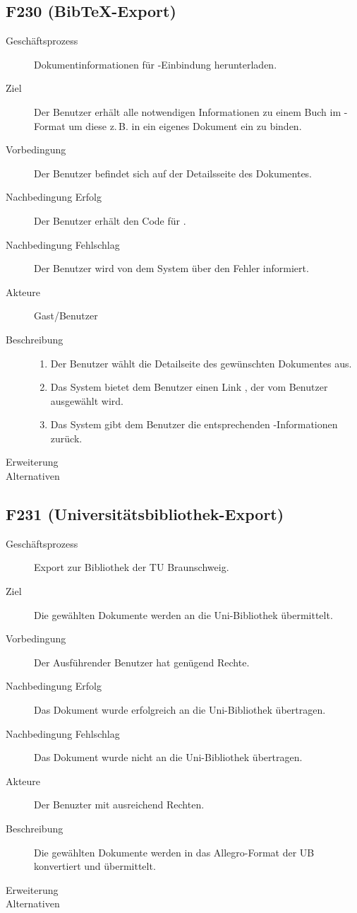 \subsection{F230 (Bib\TeX -Export)}
\begin{description}
  \item[Geschäftsprozess]Dokumentinformationen für \BibTeX-Einbindung herunterladen.
  \item[Ziel]Der Benutzer erhält alle notwendigen Informationen zu einem Buch im \BibTeX-Format um diese z.\,B. in ein eigenes Dokument ein zu binden.
  \item[Vorbedingung]Der Benutzer befindet sich auf der Detailsseite des Dokumentes.
  \item[Nachbedingung Erfolg]Der Benutzer erhält den Code für \BibTeX .
  \item[Nachbedingung Fehlschlag]Der Benutzer wird von dem System über den Fehler informiert.
  \item[Akteure]Gast/Benutzer
  \item[Beschreibung]\hfill
    \begin{enumerate}
      \item Der Benutzer wählt die Detailseite des gewünschten Dokumentes aus.
      \item Das System bietet dem Benutzer einen Link \emph{\BibTeX}, der vom Benutzer ausgewählt wird.
      \item Das System gibt dem Benutzer die entsprechenden \BibTeX -Informationen zurück.
    \end{enumerate}
  \item[Erweiterung]
  \item[Alternativen]
\end{description}

\subsection{F231 (Universitätsbibliothek-Export)}
\begin{description}
  \item[Geschäftsprozess]Export zur Bibliothek der TU Braunschweig.
  \item[Ziel]Die gewählten Dokumente werden an die Uni-Bibliothek übermittelt.
  \item[Vorbedingung]Der Ausführender Benutzer hat genügend Rechte.
  \item[Nachbedingung Erfolg]Das Dokument wurde erfolgreich an die Uni-Bibliothek übertragen.
  \item[Nachbedingung Fehlschlag]Das Dokument wurde nicht an die Uni-Bibliothek übertragen.
  \item[Akteure]Der Benuzter mit ausreichend Rechten.
  \item[Beschreibung]Die gewählten Dokumente werden in das Allegro-Format der \gls{UB} konvertiert und übermittelt.
  \item[Erweiterung]
  \item[Alternativen]
\end{description}


